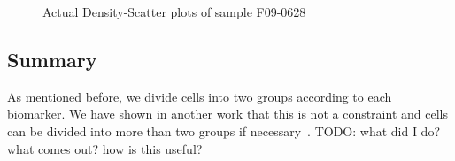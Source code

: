 \begin{figure}[!ht]
{  }
  \caption{Actual Density-Scatter plots of sample F09-0628}
  \label{fig:fcs-qa-density-scatter-DLBCL}
\end{figure}

\subsection{Summary}
As mentioned before, we divide cells into two groups according to each biomarker. We have shown in another work that this is not a constraint and cells can be divided into more than two groups if necessary~\cite{o2014enhanced}. TODO: what did I do? what comes out? how is this useful?
